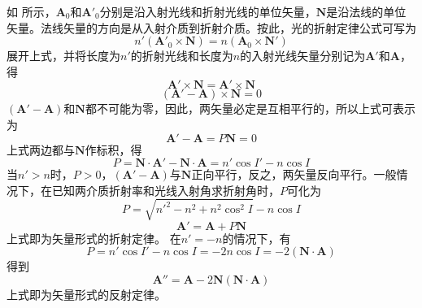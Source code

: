 \documentclass[cn,10pt,chinesefont=founder,math=newtx,cite=super,twoside]{elegantbook}
\begin{document}
如 所示，$\boldsymbol{A}_0$和$\boldsymbol{A}'_0$分别是沿入射光线和折射光线的单位矢量，$\boldsymbol{N}$是沿法线的单位矢量。法线矢量的方向是从入射介质到折射介质。按此，光的折射定律公式可写为
\begin{equation}
n'(\boldsymbol{A}'_0\times\boldsymbol{N})=n(\boldsymbol{A}_0\times\boldsymbol{N}')
\end{equation}
展开上式，并将长度为$n'$的折射光线和长度为$n$的入射光线矢量分别记为$\boldsymbol{A}'$和$\boldsymbol{A}$，得
\begin{equation}
\boldsymbol{A}'\times\boldsymbol{N}=\boldsymbol{A}'\times\boldsymbol{N}
\end{equation}
\begin{equation}
(\boldsymbol{A}'-\boldsymbol{A})\times\boldsymbol{N}=0
\end{equation}
$(\boldsymbol{A}'-\boldsymbol{A})$和$\boldsymbol{N}$都不可能为零，因此，两矢量必定是互相平行的，所以上式可表示为
\begin{equation}
\boldsymbol{A}'-\boldsymbol{A}=P\boldsymbol{N}=0
\end{equation}
上式两边都与$\boldsymbol{N}$作标积，得
\begin{equation}
P=\boldsymbol{N}\cdot\boldsymbol{A}'-\boldsymbol{N}\cdot\boldsymbol{A}=n'\cos I'-n\cos I
\end{equation}
当$n'>n$时，$P>0$，$(\boldsymbol{A}'-\boldsymbol{A})$与$\boldsymbol{N}$正向平行，反之，两矢量反向平行。一般情况下，在已知两介质折射率和光线入射角求折射角时，$P$可化为
\begin{equation}
P=\sqrt{n'^2-n^2+n^2\cos^2 I}-n\cos I
\end{equation}
\begin{equation}
\boldsymbol{A}'=\boldsymbol{A}+P\boldsymbol{N}
\end{equation}
上式即为矢量形式的折射定律。
在$n'=-n$的情况下，有
\begin{equation}
P=n'\cos I'-n\cos I=-2n\cos I=-2(\boldsymbol{N}\cdot\boldsymbol{A})
\end{equation}
得到
\begin{equation}
\boldsymbol{A}''=\boldsymbol{A}-2\boldsymbol{N}(\boldsymbol{N}\cdot\boldsymbol{A})
\end{equation}
上式即为矢量形式的反射定律。
\end{document}
